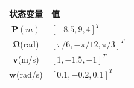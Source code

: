 \begin{table}[htp]
    \centering
    \vspace{0.5em}
    \begin{tabular}{cl}
        \toprule
        状态变量&值  \\
        \midrule
        $\mathbf{P}(m)$&$[-8.5,9,4]^T$  \\
        $\mathbf{\Omega}$(rad)&$[\pi/6,-\pi/12,\pi/3]^T$  \\
        $\mathbf{v}$(m/s)&$[1,-1.5,-1]^T$  \\
        $\mathbf{w}$(rad/s)&$[0.1,-0.2,0.1]^T$\\
        \bottomrule
    \end{tabular}    
\end{table}

